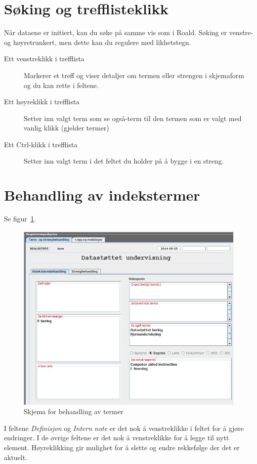 \documentclass[a4paper,norsk,11pt]{article}
\begin{document}
\section{Søking og trefflisteklikk}
Når dataene er initiert, kan du søke på samme vis som i Roald. Søking er venstre- og høyretrunkert, men dette kan du regulere med likhetstegn.
\begin{description}
\item[Ett venstreklikk i trefflista] Markerer et treff og viser detaljer om termen eller strengen i skjemaform og du kan rette i feltene.
\item[Ett høyreklikk i trefflista] Setter inn valgt term som se også-term til den termen som er valgt med vanlig klikk (gjelder termer)
\item[Ett Ctrl-klikk i trefflista] Setter inn valgt term i det feltet du holder på å bygge i en streng.
\end{description}
\section{Behandling av indekstermer}
Se figur~\ref{termskjema}.

\begin{figure}
\begin{center}
\includegraphics[width=\textwidth]{./termskjema.JPG}
\caption{Skjema for behandling av termer}\label{termskjema}
\end{center}
\end{figure}
I feltene \textit{Definisjon} og \textit{Intern note} er det nok å venstreklikke i feltet for å gjøre endringer. I de øvrige feltene er det nok å venstreklikke for å legge til nytt element. Høyreklikking gir mulighet for å slette og endre rekkefølge der det er aktuelt.
\end{document}
